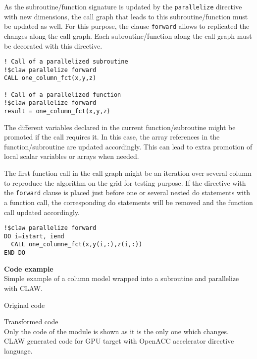 As the subroutine/function signature is updated by the \lstinline!parallelize! 
directive with new dimensions, the call graph that leads to this 
subroutine/function must be updated as well. For this purpose, the clause 
\lstinline!forward! allows to replicated the changes along the call graph. 
Each subroutine/function along the call graph must be decorated with this
directive.

\begin{lstlisting}
! Call of a parallelized subroutine
!$claw parallelize forward
CALL one_column_fct(x,y,z)

! Call of a parallelized function
!$claw parallelize forward
result = one_column_fct(x,y,z)
\end{lstlisting}

The different variables declared in the current function/subroutine might be
promoted if the call requires it. In this case, the array references in 
the function/subroutine are updated accordingly. This can lead to extra 
promotion of local scalar variables or arrays when needed.

The first function call in the call graph might be an iteration over several
column to reproduce the algorithm on the grid for testing purpose. If the 
directive with the \lstinline!forward! clause is placed just before one or 
several nested do statements with a function call, the corresponding do 
statements will be removed and the function call updated accordingly. 

\begin{lstlisting}
!$claw parallelize forward
DO i=istart, iend
  CALL one_columne_fct(x,y(i,:),z(i,:))
END DO
\end{lstlisting}


\textbf{Code example}\\
\label{parallelize1}
Simple example of a column model wrapped into a subroutine and parallelize with
CLAW.

Original code



Transformed code\\
Only the code of the module is shown as it is the only one which changes.\\

CLAW generated code for GPU target with OpenACC accelerator directive language.


